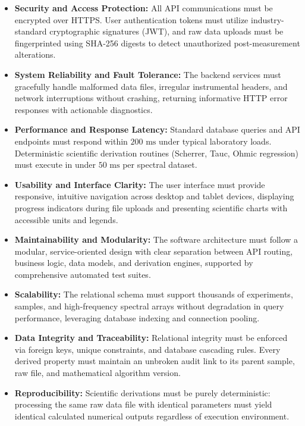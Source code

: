 \documentclass[12pt,a4paper,oneside]{report}
\begin{document}
{{{\begin{itemize}
    \item \textbf{Security and Access Protection:} All API communications must be encrypted over HTTPS. User authentication tokens must utilize industry-standard cryptographic signatures (JWT), and raw data uploads must be fingerprinted using SHA-256 digests to detect unauthorized post-measurement alterations.
    \item \textbf{System Reliability and Fault Tolerance:} The backend services must gracefully handle malformed data files, irregular instrumental headers, and network interruptions without crashing, returning informative HTTP error responses with actionable diagnostics.
    \item \textbf{Performance and Response Latency:} Standard database queries and API endpoints must respond within $200\text{ ms}$ under typical laboratory loads. Deterministic scientific derivation routines (Scherrer, Tauc, Ohmic regression) must execute in under $50\text{ ms}$ per spectral dataset.
    \item \textbf{Usability and Interface Clarity:} The user interface must provide responsive, intuitive navigation across desktop and tablet devices, displaying progress indicators during file uploads and presenting scientific charts with accessible units and legends.
    \item \textbf{Maintainability and Modularity:} The software architecture must follow a modular, service-oriented design with clear separation between API routing, business logic, data models, and derivation engines, supported by comprehensive automated test suites.
    \item \textbf{Scalability:} The relational schema must support thousands of experiments, samples, and high-frequency spectral arrays without degradation in query performance, leveraging database indexing and connection pooling.
    \item \textbf{Data Integrity and Traceability:} Relational integrity must be enforced via foreign keys, unique constraints, and database cascading rules. Every derived property must maintain an unbroken audit link to its parent sample, raw file, and mathematical algorithm version.
    \item \textbf{Reproducibility:} Scientific derivations must be purely deterministic: processing the same raw data file with identical parameters must yield identical calculated numerical outputs regardless of execution environment.
\end{itemize}

}}}
\end{document}
